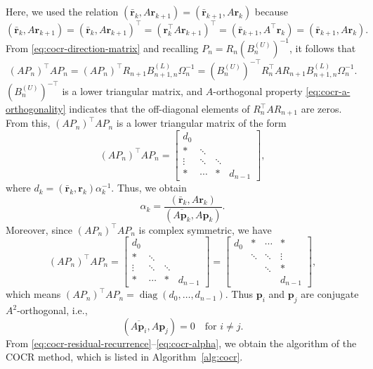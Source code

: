 {Here, we used the relation $(\bar{\bm r}_k,A\bm r_{k+1})=(\bar{\bm r}_{k+1},A\bm r_k)$ because}
\begin{equation}\label{eq:cocr-bilinear-symmetry}
(\bar{\bm r}_k,A\bm r_{k+1})=(\bar{\bm r}_k,A\bm r_{k+1})^{\top}=(\bm r_k^{\top}A\bm r_{k+1})^{\top}=(\bar{\bm r}_{k+1},A^{\top}\bm r_k)=(\bar{\bm r}_{k+1},A\bm r_k).
\end{equation}
{From \eqref{eq:cocr-direction-matrix} and recalling $P_n=R_n(B_n^{(U)})^{-1}$, it follows that}
\[(AP_n)^{\top}AP_n=(AP_n)^{\top}R_{n+1}B_{n+1,n}^{(L)}\Omega_n^{-1}
=(B_n^{(U)})^{-\top}R_n^{\top}AR_{n+1}B_{n+1,n}^{(L)}\Omega_n^{-1}.\]
{$(B_n^{(U)})^{-\top}$ is a lower triangular matrix, and $A$-orthogonal property \eqref{eq:cocr-a-orthogonality} indicates that the off-diagonal elements of $R_n^{\top}AR_{n+1}$ are zeros. From this, $(AP_n)^{\top}AP_n$ is a lower triangular matrix of the form}
\[(AP_n)^{\top}AP_n=\begin{bmatrix}d_0&&&\\ *&\ddots&&\\\vdots&\ddots&\ddots&\\ *&\cdots&*&d_{n-1}\end{bmatrix},\]
{where $d_k=(\bar{\bm r}_k,\bm r_k)\alpha_k^{-1}$. Thus, we obtain}
\begin{equation}\label{eq:cocr-alpha}\alpha_k=\frac{(\bar{\bm r}_k,A\bm r_k)}{(\overline{A\bm p_k},A\bm p_k)}.\end{equation}
{Moreover, since $(AP_n)^{\top}AP_n$ is complex symmetric, we have}
\[(AP_n)^{\top}AP_n=\begin{bmatrix}d_0&&&\\ *&\ddots&&\\\vdots&\ddots&\ddots&\\ *&\cdots&*&d_{n-1}\end{bmatrix}
=\begin{bmatrix}d_0&*&\cdots&*\\&\ddots&\ddots&\vdots\\&&\ddots&*\\&&&d_{n-1}\end{bmatrix},\]
{which means $(AP_n)^{\top}AP_n=\operatorname{diag}(d_0,\ldots,d_{n-1})$. Thus $\bm p_i$ and $\bm p_j$ are conjugate $A^2$-orthogonal, i.e.,}
\[(\overline{A\bm p_i},A\bm p_j)=0\quad\text{for }i\ne j.\]
{From \eqref{eq:cocr-residual-recurrence}--\eqref{eq:cocr-alpha}, we obtain the algorithm of the COCR method, which is listed in Algorithm\ \ref{alg:cocr}.}

